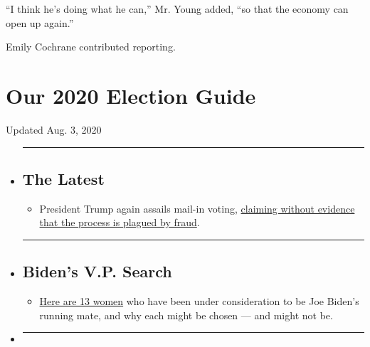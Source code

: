 ``I think he's doing what he can,'' Mr. Young added, ``so that the
economy can open up again.''

Emily Cochrane contributed reporting.

\hypertarget{our-2020-election-guide}{%
\section{Our 2020 Election Guide}\label{our-2020-election-guide}}

Updated Aug. 3, 2020

\begin{itemize}
\item
  \begin{center}\rule{0.5\linewidth}{\linethickness}\end{center}

  \hypertarget{the-latest}{%
  \subsection{The Latest}\label{the-latest}}

  \begin{itemize}
  \tightlist
  \item
    President Trump again assails mail-in voting,
    \href{https://www.nytimes.com/2020/08/03/us/politics/trump-mail-in-voting.html?action=click\&pgtype=Article\&state=default\&region=BELOW_MAIN_CONTENT\&context=storylines_guide}{claiming
    without evidence that the process is plagued by fraud}.
  \end{itemize}
\item
  \begin{center}\rule{0.5\linewidth}{\linethickness}\end{center}

  \hypertarget{bidens-vp-search}{%
  \subsection{Biden's V.P. Search}\label{bidens-vp-search}}

  \begin{itemize}
  \tightlist
  \item
    \href{https://www.nytimes.com/article/biden-vice-president-2020.html?action=click\&pgtype=Article\&state=default\&region=BELOW_MAIN_CONTENT\&context=storylines_guide}{Here
    are 13 women} who have been under consideration to be Joe Biden's
    running mate, and why each might be chosen --- and might not be.
  \end{itemize}
\item
  \begin{center}\rule{0.5\linewidth}{\linethickness}\end{center}


\end{itemize}
